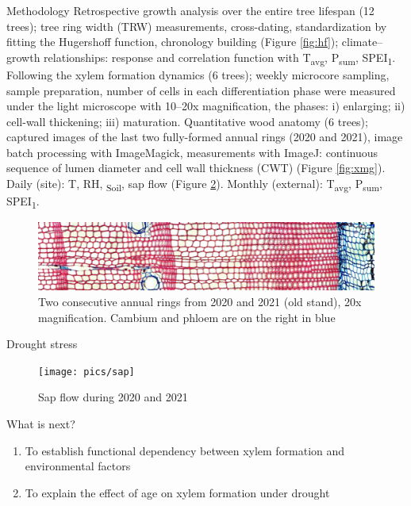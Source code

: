 \documentclass[final]{beamer}
\newlength{\colwidth}
\begin{document}
\begin{frame}[t]
\begin{columns}[t]
\begin{column}{\colwidth}
\begin{block}{Methodology}
        Retrospective growth analysis over the entire tree lifespan (12 trees); tree ring width (TRW) measurements, cross-dating, standardization by fitting the Hugershoff function, chronology building (Figure \ref{fig:hf}); climate--growth relationships: response and correlation function with T\textsubscript{avg}, P\textsubscript{sum}, SPEI\textsubscript{1}.
        Following the xylem formation dynamics (6 trees); weekly microcore sampling, sample preparation, number of cells in each differentiation phase were measured under the light microscope with 10--20x magnification, the phases: i) enlarging; ii) cell-wall thickening; iii) maturation.
        Quantitative wood anatomy (6 trees); captured images of the last two fully-formed annual rings (2020 and 2021), image batch processing with ImageMagick, measurements with ImageJ: continuous sequence of lumen diameter and cell wall thickness (CWT) (Figure \ref{fig:xmg}).
        Daily (site): T, RH, \Psi\textsubscript{Soil}, sap flow (Figure \ref{fig:sap}). Monthly (external): T\textsubscript{avg}, P\textsubscript{sum}, SPEI\textsubscript{1}.
        \begin{figure}
            \centering \includegraphics[width=1\textwidth]{pics/sob}
            \caption{Two consecutive annual rings from 2020 and 2021 (old stand), 20x magnification. Cambium and phloem are on the right in blue}
            \label{fig:sob}
        \end{figure}
\end{block}

\begin{block}{Drought stress}
        \begin{figure}
            \centering \texttt{[image: pics/sap]}
            \caption{Sap flow during 2020 and 2021}
            \label{fig:sap}
        \end{figure}
\end{block}

\begin{block}{What is next?}
    \raggedleft
    \begin{enumerate}
        \item To establish functional dependency between xylem formation and environmental factors
        \item To explain the effect of age on xylem formation under drought
    \end{enumerate}
\end{block}


\end{column}
\end{columns}
\end{frame}
\end{document}
